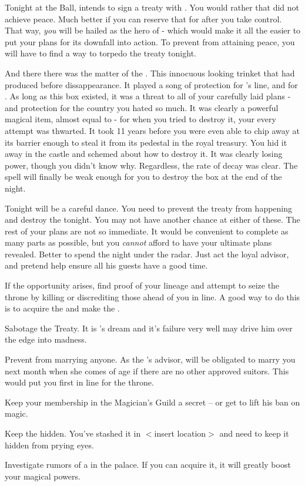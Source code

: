 \documentclass[char]{NeptuneBall}
\begin{document}
Tonight at the Ball, \cKing{\King} \cKing{} intends to sign a treaty with \pPacifica{}. You would rather that \cKing{} did not achieve peace. Much better if you can reserve that for after you take control. That way, \emph{you} will be hailed as the hero of \pAtlantis{} - which would make it all the easier to put your plans for its downfall into action. To prevent \cKing{} from attaining peace, you will have to find a way to torpedo the treaty tonight.

And there there was the matter of the \iMusicBox{\MYname}. This innocuous looking trinket that \cQueen{} had produced before \cQueen{\their} dissappearance. It played a song of protection for \cKing{}'s line, and for \pAtlantis{}. As long as this box existed, it was a threat to all of your carefully laid plans - and protection for the country you hated so much. It was clearly a powerful magical item, almost equal to \iTrident{\MYname} - for when you tried to destroy it, your every attempt was thwarted. It took 11 years before you were even able to chip away at its barrier enough to steal it from its pedestal in the royal treasury. You hid it away in the castle and schemed about how to destroy it. It was clearly losing power, though you didn't know why. Regardless, the rate of decay was clear. The spell will finally be weak enough for you to destroy the box at the end of the night.


Tonight will be a careful dance. You need to prevent the treaty from happening and destroy the \iMusicBox{} tonight. You may not have another chance at either of these. The rest of your plans are not so immediate. It would be convenient to complete as many parts as possible, but you \emph{cannot} afford to have your ultimate plans revealed. Better to spend the night under the radar. Just act the loyal advisor, and pretend help \cKing{} ensure all his guests have a good time.


\begin{itemz}[Goals]
  \item If the opportunity arises, find proof of your lineage and attempt to seize the throne by killing or discrediting those ahead of you in line. A good way to do this is to acquire the \iHemlock{} and make the \iShapeshifterPotion{}.
  \item Sabotage the Treaty. It is \cKing{}'s dream and it's failure very well may drive him over the edge into madness.
  \item Prevent \cPrincess{} from marrying anyone. As the \cKing{\King}'s advisor, \cPrincess{\they} will be obligated to marry you next month when she comes of age if there are no other approved suitors. This would put you first in line for the throne.
  \item Keep your membership in the Magician's Guild a secret -- or get \cKing{\King} \cKing{} to lift his ban on magic.
  \item Keep the \iMusicBox{} hidden. You've stashed it in $<$insert location$>$ and need to keep it hidden from prying eyes.
  \item Investigate rumors of a \iGlowShell{\MYname} in the palace. If you can acquire it, it will greatly boost your magical powers.
\end{itemz}
\end{document}
